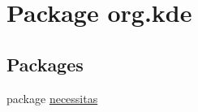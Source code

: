 \hypertarget{namespaceorg_1_1kde}{\section{Package org.\-kde}
\label{d5/dd2/namespaceorg_1_1kde}
}
\subsection*{Packages}
\begin{DoxyCompactItemize}
\item 
package \hyperlink{namespaceorg_1_1kde_1_1necessitas}{necessitas}
\end{DoxyCompactItemize}
